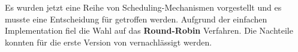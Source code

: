 Es wurden jetzt eine Reihe von Scheduling-Mechanismen vorgestellt und es musste eine Entscheidung f\"ur \mops getroffen werden. Aufgrund der einfachen Implementation fiel die Wahl auf das \textbf{Round-Robin} Verfahren. Die Nachteile konnten f\"ur die erste Version von \mops vernachl\"assigt werden.
